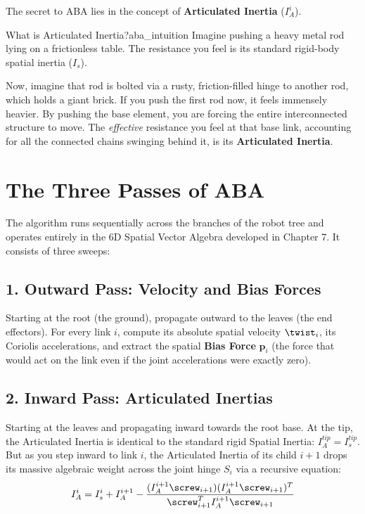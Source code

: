 The secret to ABA lies in the concept of \textbf{Articulated Inertia} ($I_A^i$). 

\begin{laymansbox}{What is Articulated Inertia?}{aba_intuition}
  Imagine pushing a heavy metal rod lying on a frictionless table. The resistance you feel is its standard rigid-body spatial inertia ($I_s$). 
  
  Now, imagine that rod is bolted via a rusty, friction-filled hinge to another rod, which holds a giant brick. If you push the first rod now, it feels immensely heavier. By pushing the base element, you are forcing the entire interconnected structure to move. The \textit{effective} resistance you feel at that base link, accounting for all the connected chains swinging behind it, is its \textbf{Articulated Inertia}.
\end{laymansbox}

\section{The Three Passes of ABA}

The algorithm runs sequentially across the branches of the robot tree and operates entirely in the 6D Spatial Vector Algebra developed in Chapter 7. It consists of three sweeps:

\subsection{1. Outward Pass: Velocity and Bias Forces}
Starting at the root (the ground), propagate outward to the leaves (the end effectors). For every link $i$, compute its absolute spatial velocity $\twist_i$, its Coriolis accelerations, and extract the spatial \textbf{Bias Force} $\bm{p}_i$ (the force that would act on the link even if the joint accelerations were exactly zero).

\subsection{2. Inward Pass: Articulated Inertias}
Starting at the leaves and propagating inward towards the root base. 
At the tip, the Articulated Inertia is identical to the standard rigid Spatial Inertia: $I_A^{tip} = I_s^{tip}$.
But as you step inward to link $i$, the Articulated Inertia of its child $i+1$ drops its massive algebraic weight across the joint hinge $S_i$ via a recursive equation:
\begin{equation}
   I_A^i = I_s^i + I_A^{i+1} - \frac{ (I_A^{i+1} \screw_{i+1}) (I_A^{i+1} \screw_{i+1})^T }{ \screw_{i+1}^T I_A^{i+1} \screw_{i+1} }
\end{equation}

